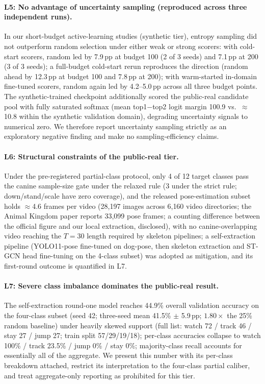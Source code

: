 \paragraph{L5: No advantage of uncertainty sampling (reproduced across three independent runs).}
In our short-budget active-learning studies (synthetic tier), entropy sampling did not outperform random selection under either weak or strong scorers: with cold-start scorers, random led by 7.9\,pp at budget 100 (2 of 3 seeds) and 7.1\,pp at 200 (3 of 3 seeds); a full-budget cold-start rerun reproduces the direction (random ahead by 12.3\,pp at budget 100 and 7.8\,pp at 200); with warm-started in-domain fine-tuned scorers, random again led by 4.2--5.0\,pp across all three budget points. The synthetic-trained checkpoint additionally scored the public-real candidate pool with fully saturated softmax (mean top1$-$top2 logit margin 100.9 vs.\ $\approx$10.8 within the synthetic validation domain), degrading uncertainty signals to numerical zero. We therefore report uncertainty sampling strictly as an exploratory negative finding and make no sampling-efficiency claims.

\paragraph{L6: Structural constraints of the public-real tier.}
Under the pre-registered partial-class protocol, only 4 of 12 target classes pass the canine sample-size gate under the relaxed rule (3 under the strict rule; down/stand/scale have zero coverage), and the released pose-estimation subset holds $\approx$4.6 frames per video (28{,}197 images across 6{,}160 video directories; the Animal Kingdom paper reports 33{,}099 pose frames; a counting difference between the official figure and our local extraction, disclosed), with no canine-overlapping video reaching the $T{=}30$ length required by skeleton pipelines; a self-extraction pipeline (YOLO11-pose fine-tuned on dog-pose, then skeleton extraction and ST-GCN head fine-tuning on the 4-class subset) was adopted as mitigation, and its first-round outcome is quantified in L7.

\paragraph{L7: Severe class imbalance dominates the public-real result.}
The self-extraction round-one model reaches 44.9\% overall validation accuracy on the four-class subset (seed 42; three-seed mean 41.5\% $\pm$ 5.9\,pp; $1.80\times$ the 25\% random baseline) under heavily skewed support (full list: watch 72 / track 46 / stay 27 / jump 27; train split 57/29/19/18); per-class accuracies collapse to watch 100\% / track 23.5\% / jump 0\% / stay 0\%; majority-class recall accounts for essentially all of the aggregate. We present this number with its per-class breakdown attached, restrict its interpretation to the four-class partial caliber, and treat aggregate-only reporting as prohibited for this tier.

